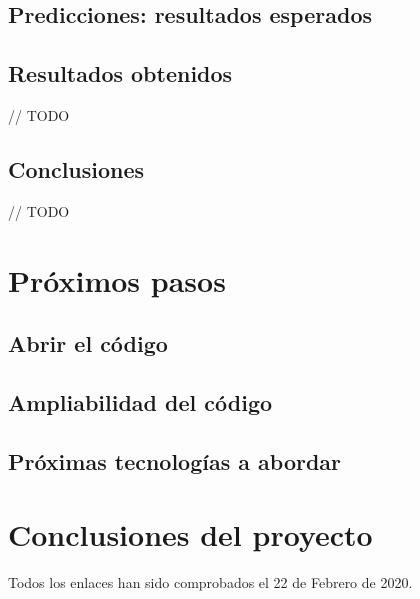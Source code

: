 \documentclass[
  a4paper,  %
  twoside,  %
  bibliography=totoc,
  headsepline,
  cleardoublepage=empty,
  parskip=half,
  draft=false
]{scrbook}
\begin{document}
\section{Predicciones: resultados esperados}


\section{Resultados obtenidos}
// TODO

\section{Conclusiones}
// TODO

\chapter{Próximos pasos}
\label{chap:further-steps}

\section{Abrir el código}


\section{Ampliabilidad del código}


\section{Próximas tecnologías a abordar}


\chapter{Conclusiones del proyecto}

\printbibliography

Todos los enlaces han sido comprobados el 22 de Febrero de 2020.

% 

\pagestyle{empty}
\renewcommand*{\chapterpagestyle}{empty}
\end{document}

